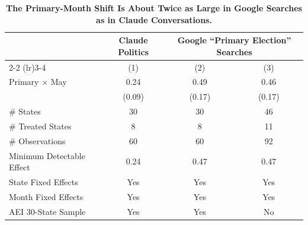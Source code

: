 \begin{table}[t]
\centering
\caption{\textbf{The Primary-Month Shift Is About Twice as Large in Google Searches as in Claude Conversations.}\label{tab:search_did}}
\begin{tabular}{lccc}
\toprule \toprule
 & Claude Politics & \multicolumn{2}{c}{Google ``Primary Election'' Searches} \\
\cmidrule(lr){2-2} \cmidrule(lr){3-4}
 & (1) & (2) & (3) \\
\midrule
Primary $\times$ May & 0.24 & 0.49 & 0.46 \\
 & (0.09) & (0.17) & (0.17) \\[2mm]
\# States & 30 & 30 & 46 \\
\# Treated States & 8 & 8 & 11 \\
\# Observations & 60 & 60 & 92 \\
Minimum Detectable Effect & 0.24 & 0.47 & 0.47 \\
\midrule
State Fixed Effects & Yes & Yes & Yes \\
Month Fixed Effects & Yes & Yes & Yes \\
AEI 30-State Sample & Yes & Yes & No \\
\bottomrule \bottomrule
\end{tabular}
\end{table}
